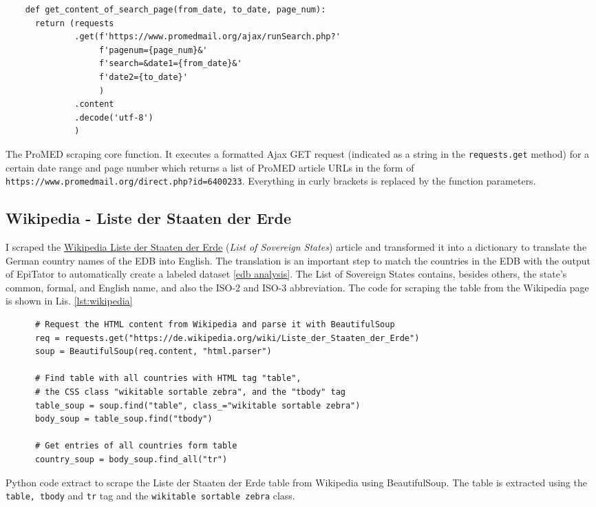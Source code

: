   \begin{listing}[h!]
    \begin{verbatim}
    def get_content_of_search_page(from_date, to_date, page_num):
      return (requests
              .get(f'https://www.promedmail.org/ajax/runSearch.php?'
                   f'pagenum={page_num}&'
                   f'search=&date1={from_date}&'
                   f'date2={to_date}'
                   )
              .content
              .decode('utf-8')
              )
    \end{verbatim}
    \caption{The ProMED scraping core function. It executes a formatted Ajax GET request (indicated as a string in the \texttt{requests.get} method) for a certain date range and page number which returns a list of ProMED article URLs in the form of \textquotesingle \texttt{https://www.promedmail.org/direct.php?id=6400233}\textquotesingle. Everything in curly brackets is replaced by the function parameters.}
    \label{lst:promed}
  \end{listing}

\subsection{Wikipedia - Liste der Staaten der Erde}\label{wikipedia}
  I scraped the \href{https://de.wikipedia.org/wiki/Liste_der_Staaten_der_Erde}{Wikipedia Liste der Staaten der Erde} (\textit{List of Sovereign States}) article and transformed it into a dictionary to translate the German country names of the EDB into English.
  The translation is an important step to match the countries in the EDB with the output of EpiTator to automatically create a labeled dataset \ref{edb analysis}.
  The List of Sovereign States contains, besides others, the state's common, formal, and English name, and also the ISO-2 and ISO-3 abbreviation.
  The code for scraping the table from the Wikipedia page is shown in Lis. \ref{lst:wikipedia}

  \begin{listing}[h]
    \begin{verbatim}
      # Request the HTML content from Wikipedia and parse it with BeautifulSoup
      req = requests.get("https://de.wikipedia.org/wiki/Liste_der_Staaten_der_Erde")
      soup = BeautifulSoup(req.content, "html.parser")

      # Find table with all countries with HTML tag "table",
      # the CSS class "wikitable sortable zebra", and the "tbody" tag
      table_soup = soup.find("table", class_="wikitable sortable zebra")
      body_soup = table_soup.find("tbody")

      # Get entries of all countries form table
      country_soup = body_soup.find_all("tr")
    \end{verbatim}
    \caption{Python code extract to scrape the Liste der Staaten der Erde table from Wikipedia using BeautifulSoup. The table is extracted using the \texttt{table, tbody} and \texttt{tr} tag and the \texttt{wikitable sortable zebra} class.}
    \label{lst:wikipedia}
  \end{listing}

